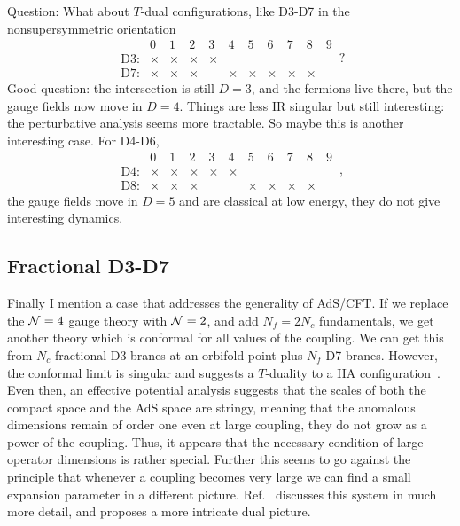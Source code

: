 \documentclass[12pt]{article}
\begin{document}
{Question: What about $T$-dual configurations, like D3-D7 in the nonsupersymmetric orientation
\begin{equation}
\begin{array}{ccccccccccc}
&0&1&2&3&4&5&6&7&8&9 \\
\mbox{D3:}&\times&\times&\times&\times&&&&&& \\
\mbox{D7:}&\times&\times&\times&&\times&\times&\times&\times&\times&
\end{array}  \,?
\end{equation}
Good question: the intersection is still $D=3$, and the fermions live there, but the gauge fields now move in $D=4$.  Things are less IR singular but still interesting: the perturbative analysis seems more tractable.  So maybe this is another interesting case.  For D4-D6,
\begin{equation}
\begin{array}{ccccccccccc}
&0&1&2&3&4&5&6&7&8&9 \\
\mbox{D4:}&\times&\times&\times&\times&\times&&&&& \\
\mbox{D8:}&\times&\times&\times&&&\times&\times&\times&\times&
\end{array}  \,,
\end{equation}
the gauge fields move in $D=5$ and are classical at low energy, they do not give interesting dynamics.

\subsection{Fractional D3-D7}

Finally I mention a case that addresses the generality of AdS/CFT.  If we replace the ${\cal N}=4$ gauge theory with ${\cal N}=2$, and add $N_f = 2N_c$ fundamentals, we get another theory which is conformal for all values of the coupling.  We can get this from $N_c$ fractional D3-branes at an orbifold point plus $N_f$ D7-branes.  However, the conformal limit is singular and suggests a $T$-duality to a IIA configuration~\cite{Grana:2001xn}.  Even then, an effective potential analysis suggests that the scales of both the compact space and the AdS space are stringy, meaning that the anomalous dimensions remain of order one even at large coupling, they do not grow as a power of the coupling.  Thus, it appears that the necessary condition of large operator dimensions is rather special.  Further this seems to go against the principle that whenever a coupling becomes very large we can find a small expansion parameter in a different picture.  Ref.~\cite{Gadde:2009dj} discusses this system in much more detail, and proposes a more intricate dual picture.

}
\end{document}
